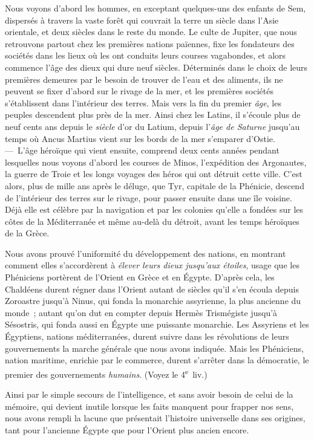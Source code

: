 \documentclass[french,twoside]{book} %
\begin{document}
\noindent Nous voyons d’abord les hommes, en exceptant quelques-uns des enfants de Sem, dispersés à travers la vaste forêt qui couvrait la terre un siècle dans l’Asie orientale, et deux siècles dans le reste du monde. Le culte de Jupiter, que nous retrouvons partout chez les premières nations païennes, fixe les fondateurs des sociétés dans les lieux où les ont conduits leurs courses vagabondes, et alors commence l’âge des dieux qui dure neuf siècles. Déterminés dans le choix de leurs premières demeures par le besoin de trouver de l’eau et des aliments, ils ne peuvent se fixer d’abord sur le rivage de la mer, et les premières sociétés s’établissent dans l’intérieur des terres. Mais vers la fin du premier {\itshape âge}, les  peuples descendent plus près de la mer. Ainsi chez les Latins, il s’écoule plus de neuf cents ans depuis le {\itshape siècle} d’or du Latium, depuis l’{\itshape âge de Saturne} jusqu’au temps où Ancus Martius vient sur les bords de la mer s’emparer d’Ostie. — L’âge héroïque qui vient ensuite, comprend deux cents années pendant lesquelles nous voyons d’abord les courses de Minos, l’expédition des Argonautes, la guerre de Troie et les longs voyages des héros qui ont détruit cette ville. C’est alors, plus de mille ans après le déluge, que Tyr, capitale de la Phénicie, descend de l’intérieur des terres sur le rivage, pour passer ensuite dans une île voisine. Déjà elle est célèbre par la navigation et par les colonies qu’elle a fondées sur les côtes de la Méditerranée et même au-delà du détroit, avant les temps héroïques de la Grèce.\par
Nous avons prouvé l’uniformité du développement des nations, en montrant comment elles s’accordèrent à {\itshape élever leurs dieux jusqu’aux étoiles}, usage que les Phéniciens portèrent de l’Orient en Grèce et en Égypte. D’après cela, les Chaldéens durent régner dans l’Orient autant de siècles qu’il s’en écoula depuis Zoroastre jusqu’à Ninus, qui fonda la monarchie assyrienne, la plus ancienne du monde ; autant qu’on dut en compter depuis Hermès Trismégiste jusqu’à Sésostris, qui fonda aussi en Égypte une puissante monarchie. Les Assyriens et les Égyptiens, nations méditerranées, durent suivre dans les révolutions de leurs gouvernements la marche générale que nous avons indiquée. Mais les Phéniciens, nation maritime, enrichie par le commerce, durent s’arrêter dans la démocratie, le premier des gouvernements {\itshape humains}. (Voyez le 4\textsuperscript{e} liv.)\par
Ainsi par le simple secours de l’intelligence, et sans avoir besoin de celui de la mémoire, qui devient inutile lorsque les faits manquent pour frapper nos sens, nous avons rempli la lacune que présentait l’histoire universelle dans ses origines, tant pour l’ancienne Égypte que pour l’Orient plus ancien encore.\par
\end{document}
